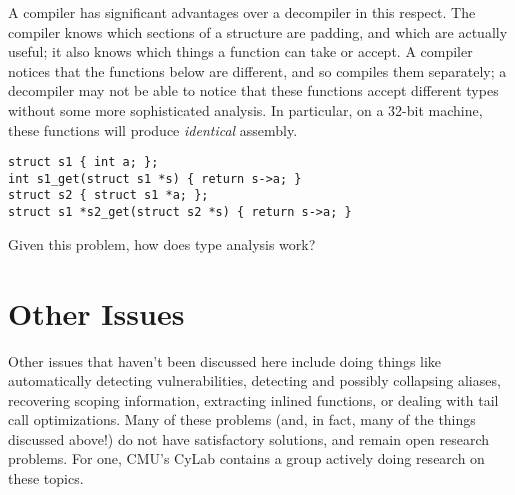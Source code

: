 \documentclass{article}
\begin{document}
A compiler has significant advantages over a decompiler in this respect. The compiler knows
which sections of a structure are padding, and which are actually useful; it also knows which
things a function can take or accept. A compiler notices that the functions below are 
different, and so compiles them separately; a decompiler may not be able to notice that these
functions accept different types without some more sophisticated analysis. In particular, 
on a 32-bit machine, these functions will produce {\em identical} assembly.

\begin{verbatim}
struct s1 { int a; };
int s1_get(struct s1 *s) { return s->a; }
struct s2 { struct s1 *a; };
struct s1 *s2_get(struct s2 *s) { return s->a; }
\end{verbatim}

Given this problem, how does type analysis work?

\section{Other Issues}
Other issues that haven't been discussed here include doing things like automatically detecting
vulnerabilities, detecting and possibly collapsing aliases, recovering scoping information, extracting inlined functions, or dealing
with tail call optimizations. Many of these problems (and, in fact, many of the things discussed
above!) do not have satisfactory solutions, and remain open research problems. 
For one, CMU's CyLab contains a group actively doing research on these topics.
\end{document}
